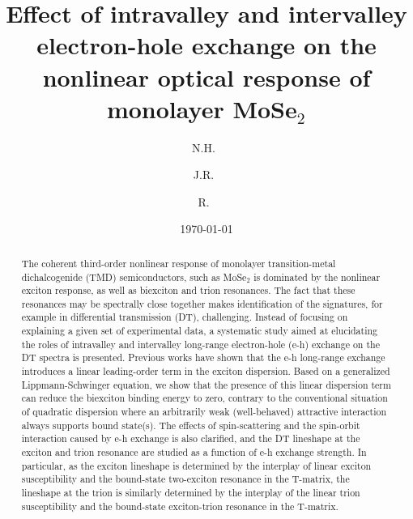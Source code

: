 \documentclass[aps,prb,superscriptaddress,letterpaper,amsmath,amssymb,twocolumn,preprintnumbers]{revtex4}
\begin{document}




\title{Effect of intravalley and intervalley electron-hole exchange on the nonlinear optical response of monolayer MoSe$_2$}



\author{N.H.~}


\author{J.R.~}

\author{R.~}




\date{\today}


\begin{abstract}
The coherent third-order nonlinear response of monolayer transition-metal dichalcogenide (TMD) semiconductors, such as MoSe$_2$ is dominated by the nonlinear exciton response, as well as biexciton and trion resonances. The  fact that these resonances may be spectrally close together makes identification of the signatures, for example in differential transmission (DT), challenging. Instead of focusing on explaining a given set of experimental data,  a systematic study aimed at elucidating the roles of intravalley and intervalley long-range electron-hole (e-h) exchange on the DT spectra is presented.
%
 Previous works have shown that the e-h long-range exchange introduces a linear leading-order term in the exciton dispersion. Based on a generalized Lippmann-Schwinger equation, we show that the presence of this linear dispersion term can reduce the biexciton binding energy to zero, contrary to the conventional situation of quadratic dispersion where an arbitrarily weak (well-behaved) attractive interaction always supports bound state(s).
%
The effects of spin-scattering and the spin-orbit interaction
caused by e-h exchange is also clarified, and the DT lineshape at the exciton and trion resonance are studied as a function of e-h exchange strength. In particular, as the exciton lineshape is determined by the interplay of linear exciton susceptibility and the bound-state two-exciton  resonance in the T-matrix, the lineshape at the trion is similarly determined by the interplay of the linear trion susceptibility and the bound-state exciton-trion  resonance in the T-matrix.
\end{abstract}
\end{document}
